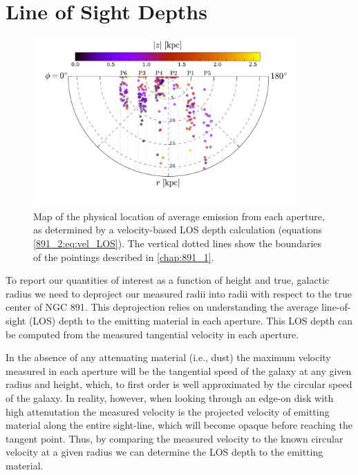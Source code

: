 \section{Line of Sight Depths}
\label{891_2:sec:LOS}

\begin{figure}
  \centering
  \includegraphics[width=0.9\textwidth, trim={0 1.5cm 0 0}, clip]{891_2/figs/velocity_projection.pdf}
  \caption[Map of \GP apertures in cylindrical
    coordinates]{\fixspacing\label{891_2:fig:velocity_projection}Map
    of the physical location of average emission from each aperture,
    as determined by a velocity-based LOS depth calculation (equations
    \ref{891_2:eq:vel_LOS}). The vertical dotted lines show the
    boundaries of the \GP pointings described in \ref{chap:891_1}.}
\end{figure}

To report our quantities of interest as a function of height and true,
galactic radius we need to deproject our measured radii into radii
with respect to the true center of NGC 891. This deprojection relies
on understanding the average line-of-sight (LOS) depth to the emitting
material in each \GP aperture. This LOS depth can be computed from the
measured tangential velocity in each aperture.

In the absence of any attenuating material (i.e., dust) the maximum
velocity measured in each aperture will be the tangential speed of the
galaxy at any given radius and height, which, to first order is well
approximated by the circular speed of the galaxy.  In reality,
however, when looking through an edge-on disk with high attenutation
the measured velocity is the projected velocity of emitting material
along the entire sight-line, which will become opaque before reaching
the tangent point. Thus, by comparing the measured velocity to the
known circular velocity at a given radius we can determine the LOS
depth to the emitting material.

